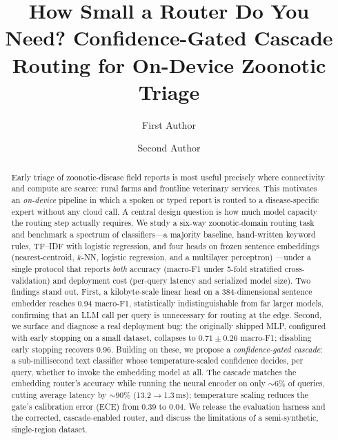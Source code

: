 \documentclass[runningheads]{llncs}
\begin{document}
\title{How Small a Router Do You Need? Confidence-Gated Cascade
Routing for On-Device Zoonotic Triage}


\author{First Author \and Second Author}

\maketitle

\begin{abstract}
Early triage of zoonotic-disease field reports is most useful precisely where
connectivity and compute are scarce: rural farms and frontline veterinary
services. This motivates an \emph{on-device} pipeline in which a spoken or typed
report is routed to a disease-specific expert without any cloud call. A central
design question is how much model capacity the routing step actually requires.
We study a six-way zoonotic-domain routing task and benchmark a spectrum of
classifiers---a majority baseline, hand-written keyword rules, TF--IDF with
logistic regression, and four heads on frozen sentence embeddings
(nearest-centroid, $k$-NN, logistic regression, and a multilayer perceptron)
---under a single protocol that reports \emph{both} accuracy (macro-F1 under
5-fold stratified cross-validation) and deployment cost (per-query latency and
serialized model size). Two findings stand out. First, a kilobyte-scale linear
head on a 384-dimensional sentence embedder reaches $0.94$ macro-F1, statistically
indistinguishable from far larger models, confirming that an LLM call per query
is unnecessary for routing at the edge. Second, we surface and diagnose a
real deployment bug: the originally shipped MLP, configured with early stopping
on a small dataset, collapses to $0.71 \pm 0.26$ macro-F1; disabling early
stopping recovers $0.96$. Building on these, we propose a \emph{confidence-gated
cascade}: a sub-millisecond text classifier whose temperature-scaled confidence
decides, per query, whether to invoke the embedding model at all. The cascade
matches the embedding router's accuracy while running the neural encoder on only
$\sim$6\% of queries, cutting average latency by $\sim$90\% (13.2$\to$1.3\,ms);
temperature scaling reduces the gate's calibration error (ECE) from $0.39$ to
$0.04$. We release the evaluation harness and the corrected, cascade-enabled
router, and discuss the limitations of a semi-synthetic, single-region dataset.
\end{abstract}
\end{document}
